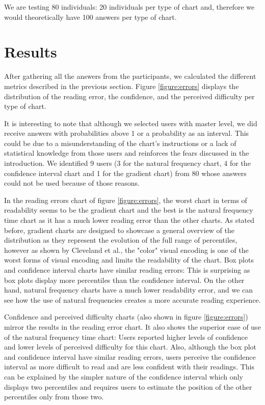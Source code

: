 \documentclass[a4paper,3p,sort&compress]{elsarticle}
\begin{document}
We are testing 80 individuals: 20 individuals per type of chart and, therefore we would theoretically have 100 answers per 
type of chart.

\section{Results}
\label{sec:results}


After gathering all the answers from the participants, we calculated the different metrics described in the previous section.
 Figure \ref{figure:errors} displays 
the distribution of the reading error, the confidence, and the perceived difficulty per type of chart. 

It is interesting to note that although we selected users with master level, we did receive answers with probabilities 
above 1 or a probability as an interval. This could be due to a misunderstanding of the chart's instructions or 
a lack of statistical knowledge from those 
users and reinforces the fears discussed in the introduction. We identified 9 users (3 for the natural frequency chart, 
4 for the confidence interval chart and 1 for the gradient chart)
 from 80 whose answers could not be used because of those reasons.

In the reading errors chart of figure \ref{figure:errors}, the worst chart in terms of readability seems to be the 
gradient chart and the best is the natural frequency time chart as it has a much lower reading error than the other charts. As stated before, 
gradient charts are designed to showcase a general overview of the distribution as they represent the evolution of the
full range of percentiles, however as shown by Cleveland et al., the "color" visual encoding is one of the 
worst forms of visual encoding and limits the readability of the chart. Box plots and confidence interval charts have similar reading errors: This is surprising
as box plots display more percentiles than the confidence interval. On the other hand, natural 
frequency charts have a much lower readability error, and we can see how the use of natural frequencies creates a more accurate reading experience.

Confidence and perceived difficulty charts (also shown in figure \ref{figure:errors}) mirror the results in the reading error chart.
It also shows the superior ease of use 
of the natural frequency time chart: Users reported higher levels of confidence and 
lower levels of perceived difficulty for this chart. Also, although the box plot and confidence interval have similar reading errors,
users perceive the confidence interval as more difficult to read and are less confident with their readings. This can be explained by 
the simpler nature of the confidence interval which only displays two percentiles and requires users to estimate the position of the other 
percentiles only from those two.
\end{document}

